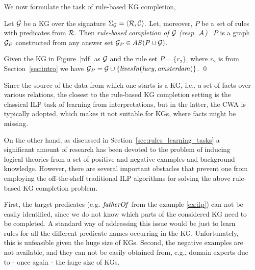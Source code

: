 We now formulate the task of rule-based KG completion,

 \begin{definition}\label{def:kgcomp} Let $\mathcal{G}$ be a KG  over the signature $\Sigma_{\mathcal{G}}=\langle\mathcal{R},\mathcal{C}\rangle$. Let, moreover, $P$ be a set of rules with predicates from $\mathcal{R}$. 
 Then \emph{rule-based completion of $\mathcal{G}$ (resp. $\mathcal{A}$) \wrt\ $P$} is a graph $\mathcal{G}_{P}$ constructed from any answer set $\mathcal{G}_{P}\in AS(P \cup \mathcal{G})$. 
 \end{definition}
 
 \begin{example}
 Given the KG in Figure~\ref{rdf} as $\mathcal{G}$ and the rule set $P=\{r_2\}$, where $r_2$ is from Section~\ref{sec:intro} 
 we have $\mathcal{G}_{P}=\mathcal{G} \cup \{\mathit{livesIn(lucy,amsterdam)}\}$. \qed
 \end{example}

Since the source of the data from which one starts is a KG, i.e., a set of facts over various relations, the closest to the rule-based KG completion setting is the classical ILP task of learning from interpretations, but in the latter, the CWA is typically adopted, which makes it not suitable for KGs, where facts might be missing. 

On the other hand, as discussed in Section~\ref{sec:rules_learning_tasks} a significant amount of research has been devoted to the problem of inducing logical theories from a set of positive and negative examples and background knowledge. However, there are several important obstacles that prevent one from employing the off-the-shelf traditional ILP algorithms for solving the above rule-based KG completion problem. 

First, the target predicates (e.g. $\mathit{fatherOf}$ from the example \ref{ex:ilp}) can
not be easily identified, since we do not know which parts of the considered KG need to
 be completed. A standard way of addressing this issue would be just to learn rules for all
 the different predicate names occurring in the KG. Unfortunately, this is unfeasible
 given the huge size of KGs. Second, the negative examples are not available,
 and they can not be easily obtained from, e.g., domain experts due to - once again
 - the huge size of KGs. %

